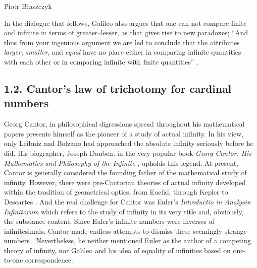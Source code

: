 \begin{artengenv}{Piotr Błaszczyk}

In the dialogue that  follows, Galileo also argues that one can not compare finite and infinite in terms of 
greater--lesser, as that gives rise to new paradoxes; 
``And thus from your ingenious argument we are led to 
conclude that the attributes \textit{larger}, \textit{smaller}, and \textit{equal}
have no place either in comparing infinite quantities with each 
other or in comparing infinite with finite quantities'' \parencite[33]{ref_GG56}. 

\subsection{1.2. Cantor's  law of trichotomy for cardinal numbers}
Georg Cantor, in  philosophical 
digressions spread throughout his mathematical papers presents himself as the pioneer of a study of actual infinity. In his view,   only  Leibniz and Bolzano had approached the absolute infinity seriously before he did. His biographer, Joseph Dauben, in the very popular book \textit{Georg Cantor. His Mathematics and Philosophy of the Infinite} \parencite*{ref_jd}, upholds this legend. At present,  Cantor is generally considered the founding father of the mathematical study of infinity.  However,  there were pre-Cantorian theories of actual infinity developed within the tradition of geometrical optics, from Euclid, through Kepler to Descartes \parencite[see][]{ref_pb20}. And the real challenge for Cantor was  Euler's \textit{Introductio in Analysin Infinitorum} \parencite*{ref_LE48} which refers to the study of infinity in its very title and, obviously, the substance content. Since Euler's infinite numbers were inverses of infinitesimals, Cantor made endless attempts to dismiss these seemingly strange numbers \parencite[see][]{ref_bf}. Nevertheless, he neither mentioned Euler as the author of a competing theory of infinity, nor Galileo and his idea of equality of infinities based on one-to-one correspondence. 


\end{artengenv}
